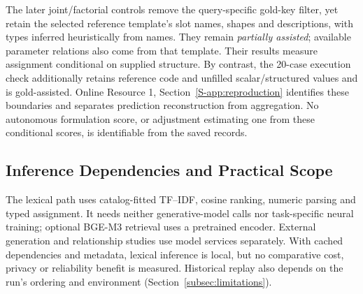 \documentclass[pdflatex,iicol,sn-basic,Numbered]{sn-jnl}
\begin{document}
The later joint/factorial controls remove the query-specific gold-key filter, yet retain the selected reference template's slot names, shapes and descriptions, with types inferred heuristically from names. They remain \emph{partially assisted}; available parameter relations also come from that template. Their results measure assignment conditional on supplied structure. By contrast, the 20-case execution check additionally retains reference code and unfilled scalar/structured values and is gold-assisted. Online Resource 1, Section~\ref{S-app:reproduction} identifies these boundaries and separates prediction reconstruction from aggregation. No autonomous formulation score, or adjustment estimating one from these conditional scores, is identifiable from the saved records.

\subsection{Inference Dependencies and Practical Scope}
\label{subsec:inference-dependencies}
The lexical path uses catalog-fitted TF--IDF, cosine ranking, numeric parsing and typed assignment. It needs neither generative-model calls nor task-specific neural training; optional BGE-M3 retrieval uses a pretrained encoder. External generation and relationship studies use model services separately. With cached dependencies and metadata, lexical inference is local, but no comparative cost, privacy or reliability benefit is measured. Historical replay also depends on the run's ordering and environment (Section~\ref{subsec:limitations}).
\end{document}
